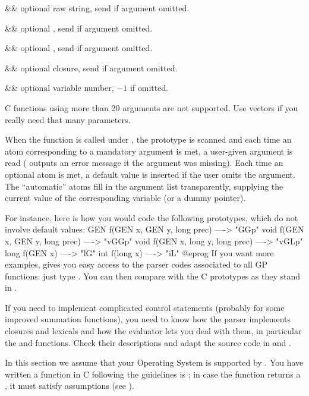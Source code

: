 \+&& optional raw string, send  if argument omitted.\cr

\+&& optional , send  if argument omitted.\cr

\+&& optional , send  if argument omitted.\cr

\+&& optional closure, send  if argument omitted.\cr

\+&& optional variable number, $-1$ if omitted.\cr

 C functions using more than 20 arguments are not
supported. Use vectors if you really need that many parameters.

When the function is called under , the prototype is scanned and each
time an atom corresponding to a mandatory argument is met, a user-given
argument is read ( outputs an error message it the argument was
missing). Each time an optional atom is met, a default value is inserted if the
user omits the argument. The ``automatic'' atoms fill in the argument list
transparently, supplying the current value of the corresponding variable (or a
dummy pointer).

For instance, here is how you would code the following prototypes, which
do not involve default values:
\bprog
GEN f(GEN x, GEN y, long prec)   ----> "GGp"
void f(GEN x, GEN y, long prec)  ----> "vGGp"
void f(GEN x, long y, long prec) ----> "vGLp"
long f(GEN x)                    ----> "lG"
int f(long x)                    ----> "iL"
@eprog\noindent
If you want more examples,  gives you easy access to the parser codes
associated to all GP functions: just type . You
can then compare with the C prototypes as they stand in .

 If you need to implement complicated control statements
(probably for some improved summation functions), you need to know
how the parser implements closures and lexicals and how the evaluator lets
you deal with them, in particular the  and 
functions. Check their descriptions and adapt the source code in
 and .


In this section we assume that your Operating System is supported by
. You have written a function in C following the guidelines is
; in case the function returns a , it
must satisfy  assumptions (see ).

